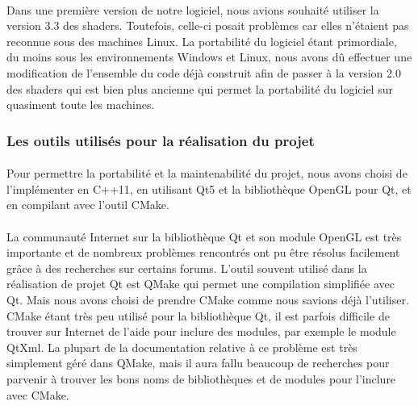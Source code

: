 \paragraph{}
Dans une première version de notre logiciel, nous avions souhaité utiliser la version 3.3 des shaders. Toutefois, celle-ci posait problèmes car elles n'étaient pas reconnue sous des machines Linux. La portabilité du logiciel étant primordiale, du moins sous les environnements Windows et Linux, nous avons dû effectuer une modification de l'ensemble du code déjà construit afin de passer à la version 2.0 des shaders qui est bien plus ancienne qui permet la portabilité du logiciel sur quasiment toute les machines.

\subsubsection{Les outils utilisés pour la réalisation du projet}
\paragraph{}
Pour permettre la portabilité et la maintenabilité du projet, nous avons choisi de l'implémenter en C++11, en utilisant Qt5 et la bibliothèque OpenGL pour Qt, et en compilant avec l'outil CMake.

\paragraph{}
La communauté Internet sur la bibliothèque Qt et son module OpenGL est très importante et de nombreux problèmes rencontrés ont pu être résolus facilement grâce à des recherches sur certains forums. 
L'outil souvent utilisé dans la réalisation de projet Qt est QMake qui permet une compilation simplifiée avec Qt. Mais nous avons choisi de prendre CMake comme nous savions déjà l'utiliser.
CMake étant très peu utilisé pour la bibliothèque Qt, il est parfois difficile de trouver sur Internet de l'aide pour inclure des modules, par exemple le module QtXml. La plupart de la documentation relative à ce problème est très simplement géré dans QMake, mais il aura fallu beaucoup de recherches pour parvenir à trouver les bons noms de bibliothèques et de modules pour l'inclure avec CMake.
